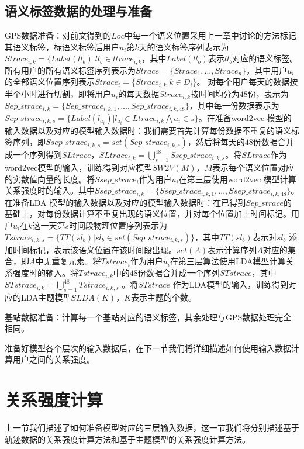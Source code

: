 \subsection{语义标签数据的处理与准备}
GPS数据准备：对前文得到的$Loc$中每一个语义位置采用上一章中讨论的方法标记其语义标签，标语义标签后用户$u_{i}$第$k$天的语义标签序列表示为$Strace_{i,k}=\{Label(ll_{b})|ll_{b}\in ltrace_{i,k}$，其中$Label(ll_{b})$表示$ll_{b}$对应的语义标签。所有用户的所有语义标签序列表示为$Strace=\{Strace_{1},...,Strace_{n}\}$，其中用户$u_{i}$的全部语义位置序列表示$Strace_{i}=\{Strace_{i,k}|k\in D_{i}\}$。 对每个用户每天的数据按半个小时进行切割，即将用户$u_{i}$的每天数据$Strace_{i,k}$按时间均分为$48$份，表示为$Sep\_strace_{i,k}=\{Sep\_strace_{i,k,1},...,Sep\_strace_{i,k,48}\}$，其中每一份数据表示为$Sep\_strace_{i,k,s}=\{Label(l_{a_{i}})|l_{a_{i}}\in Ltrace_{i,k} \bigwedge a_{i}\in s\}$。在准备word2vec 模型的输入数据以及对应的模型输入数据时：我们需要首先计算每份数据不重复的语义标签序列，即$Ssep\_strace_{i,k,s}=set(Sep\_strace_{i,k,s})$，然后将每天的$48$份数据合并成一个序列得到$SLtrace$，$SLtrace_{i,k}=\bigcup_{s=1}^{48}Ssep\_strace_{i,k,s}$。将$SLtrace$作为word2vec模型的输入，训练得到对应模型$SW2V(M)$，$M$表示每个语义位置对应的实数值向量的长度。将$Ssep\_strace_{i}$作为用户$u_{i}$在第三层使用word2vec 模型计算关系强度时的输入。其中$Ssep\_strace_{i,k}=\{Ssep\_strace_{i,k,1},...,Ssep\_strace_{i,k,48}\}$。在准备LDA 模型的输入数据以及对应的模型输入数据时：在已得到$Sep\_strace$的基础上，对每份数据计算不重复出现的语义位置，并对每个位置加上时间标记。用户$u_{i}$在$k$这一天第$s$时间段物理位置序列表示为$Tstrace_{i,k,s}=\{TT(sl_{b})|sl_{b}\in set(Sep\_strace_{i,k,s})\}$，其中$TT(sl_{b})$表示对$sl_{b}$ 添加时间标记，表示该语义位置在该时间段出现。$set(A)$表示计算序列$A$对应的集合，即$A$中无重复元素。将$Tstrace_{i}$作为用户$u_{i}$在第三层算法使用LDA模型计算关系强度时的输入。将$Tstrace_{i,k}$中的$48$份数据合并成一个序列$STstrace$，其中$STstrace_{i,k}=\bigcup_{s=1}^{48}Tstrace_{i,k,s}$ 。将$STstrace$ 作为LDA模型的输入，训练得到对应的LDA主题模型$SLDA(K)$，$K$表示主题的个数。
\par 基站数据准备：计算每一个基站对应的语义标签，其余处理与GPS数据处理完全相同。
\par 准备好模型各个层次的输入数据后，在下一节我们将详细描述如何使用输入数据计算用户之间的关系强度。
\section{关系强度计算}
\label{sec:section4-3}
上一节我们描述了如何准备模型对应的三层输入数据，这一节我们将分别描述基于轨迹数据的关系强度计算方法和基于主题模型的关系强度计算方法。
